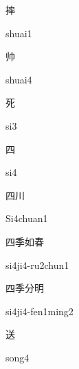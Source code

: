 \begin{verbete}[shuai1]{摔}
\begin{pronuncia}{shuai1}
\end{pronuncia}
\end{verbete}

\begin{verbete}[shuai4]{帅}
\begin{pronuncia}{shuai4}
\end{pronuncia}
\end{verbete}

\begin{verbete}[si3]{死}
\begin{pronuncia}{si3}
\end{pronuncia}
\end{verbete}

\begin{verbete}[si4]{四}
\begin{pronuncia}{si4}
\end{pronuncia}
\end{verbete}

\begin{verbete}[Si4chuan1]{四川}
\begin{pronuncia}{Si4chuan1}
\end{pronuncia}
\end{verbete}

\begin{verbete}[si4ji4-ru2chun1]{四季如春}
\begin{pronuncia}{si4ji4-ru2chun1}
\end{pronuncia}
\end{verbete}

\begin{verbete}{四季分明}
\begin{pronuncia}{si4ji4-fen1ming2}
\end{pronuncia}
\end{verbete}

\begin{verbete}[song4]{送}
\begin{pronuncia}{song4}
\end{pronuncia}
\end{verbete}


